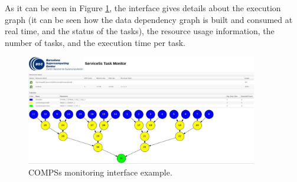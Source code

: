 As it can be seen in Figure \ref{fig:monitoring_interface}, the interface gives details about the execution graph 
(it can be seen how the data dependency graph is built and consumed at real time, and the status of the tasks), 
the resource usage information, the number of tasks, and the execution time per task.

\begin{figure}[thb!]
  \centering
    \includegraphics[width=0.9\textwidth]{./Sections/3_Running_Apps/Figures/compss_monitoring.jpeg}
    \caption{COMPSs monitoring interface example. \label{fig:monitoring_interface}}
\end{figure}